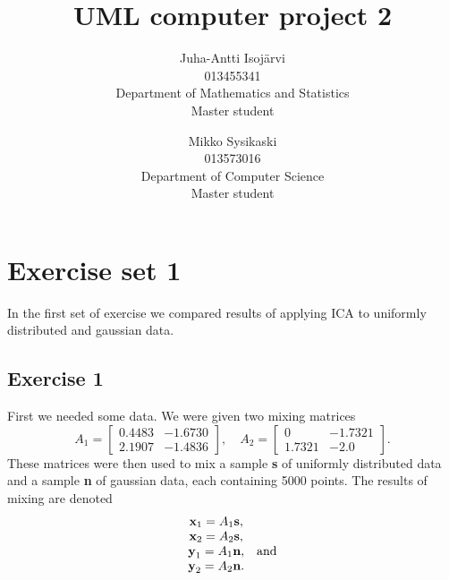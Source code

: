 \documentclass{article}
\begin{document}
\title{UML computer project 2}
\author{
Juha-Antti Isojärvi\\
013455341 \\
Department of Mathematics and Statistics\\
Master student
\and
Mikko Sysikaski\\
013573016\\
Department of Computer Science\\
Master student}
\date{}
\maketitle

\section{Exercise set 1}
In the first set of exercise we compared results of applying ICA to
uniformly distributed and gaussian data.
\subsection{Exercise 1}\label{sec:11}
First we needed some data. We were given two mixing matrices 
\[
A_1 = \left[ \begin{array}{ccc}
0.4483 & -1.6730  \\
2.1907 & -1.4836  \end{array} \right], \quad
A_2 = \left[ \begin{array}{ccc}
0 & -1.7321  \\
1.7321 & -2.0  \end{array} \right].
\]
These matrices were then used to mix a sample \textbf{s} of uniformly distributed
data and a sample \textbf{n} of gaussian data, each containing 5000
points. The results of mixing are denoted 
\[
\begin{array}{ccc}
\textbf{x}_1 = A_1\textbf{s}, \\
\textbf{x}_2 = A_2\textbf{s}, \\
\textbf{y}_1 = A_1\textbf{n}, & \textup{and} \\
\textbf{y}_2 = A_2\textbf{n}.
\end{array}
\]
\end{document}
